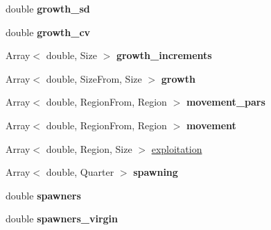 \begin{DoxyCompactItemize}
\item 
\hypertarget{classIOSKJ_1_1Fish_a77bdf6f3c1182096edbc65b3c7881c1f}{double {\bfseries growth\-\_\-sd}}\label{classIOSKJ_1_1Fish_a77bdf6f3c1182096edbc65b3c7881c1f}

\item 
\hypertarget{classIOSKJ_1_1Fish_ac82b9dfa22a29fca944f1ec591e9d8d1}{double {\bfseries growth\-\_\-cv}}\label{classIOSKJ_1_1Fish_ac82b9dfa22a29fca944f1ec591e9d8d1}

\item 
\hypertarget{classIOSKJ_1_1Fish_a5fee8014f660af2af1801ee18dba2a73}{Array$<$ double, Size $>$ {\bfseries growth\-\_\-increments}}\label{classIOSKJ_1_1Fish_a5fee8014f660af2af1801ee18dba2a73}

\item 
\hypertarget{classIOSKJ_1_1Fish_a543e74ce81cd4ecf90807da0cd261df6}{Array$<$ double, Size\-From, Size $>$ {\bfseries growth}}\label{classIOSKJ_1_1Fish_a543e74ce81cd4ecf90807da0cd261df6}

\item 
\hypertarget{classIOSKJ_1_1Fish_a5c868e34918dd840331c7452053791e1}{Array$<$ double, Region\-From, Region $>$ {\bfseries movement\-\_\-pars}}\label{classIOSKJ_1_1Fish_a5c868e34918dd840331c7452053791e1}

\item 
\hypertarget{classIOSKJ_1_1Fish_aa1da3f734344a9dbfbabf192493b737d}{Array$<$ double, Region\-From, Region $>$ {\bfseries movement}}\label{classIOSKJ_1_1Fish_aa1da3f734344a9dbfbabf192493b737d}

\item 
Array$<$ double, Region, Size $>$ \hyperlink{classIOSKJ_1_1Fish_ac75234d73d32d8aa63243b54b20c0fa1}{exploitation}
\item 
\hypertarget{classIOSKJ_1_1Fish_a8ce79faa3a7599320738fc7479e44813}{Array$<$ double, Quarter $>$ {\bfseries spawning}}\label{classIOSKJ_1_1Fish_a8ce79faa3a7599320738fc7479e44813}

\item 
\hypertarget{classIOSKJ_1_1Fish_a64c0d4b35c1cee840caacfa6fd71f912}{double {\bfseries spawners}}\label{classIOSKJ_1_1Fish_a64c0d4b35c1cee840caacfa6fd71f912}

\item 
\hypertarget{classIOSKJ_1_1Fish_a4bd5e4c696fb248fc4741382343e90a6}{double {\bfseries spawners\-\_\-virgin}}\label{classIOSKJ_1_1Fish_a4bd5e4c696fb248fc4741382343e90a6}

\end{DoxyCompactItemize}


